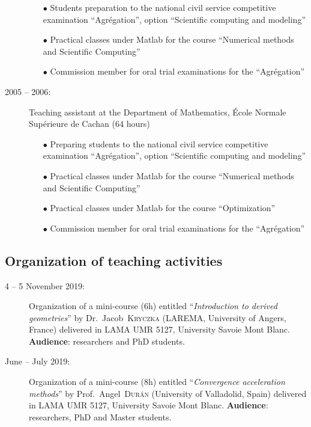 \begin{description}
        \begin{itemize}
            \item[$\bullet$] Students preparation to the national civil service competitive examination ``Agr\'egation'', option ``Scientific computing and modeling''
            \item[$\bullet$] Practical classes under Matlab for the course ``Numerical methods and Scientific Computing''
            \item[$\bullet$] Commission member for oral trial examinations for the ``Agr\'egation''
        \end{itemize}
        \item[2005 -- 2006:] Teaching assistant at the Department of Mathematics, \'Ecole Normale Sup\'erieure de Cachan (64 hours)
        \begin{itemize}
            \item[$\bullet$] Preparing students to the national civil service competitive examination ``Agr\'egation'', option ``Scientific computing and modeling''
            \item[$\bullet$] Practical classes under Matlab for the course ``Numerical methods and Scientific Computing''
            \item[$\bullet$] Practical classes under Matlab for the course ``Optimization''
            \item[$\bullet$] Commission member for oral trial examinations for the ``Agr\'egation''
        \end{itemize}
    \end{description}

    \separator
    \subsection{Organization of teaching activities}
    \begin{description}
        \item[4 -- 5 November 2019:] Organization of a mini-course (6h) entitled ``\textit{Introduction to derived geometries}'' by Dr.~Jacob~\textsc{Kryczka} (LAREMA, University of Angers, France) delivered in LAMA UMR 5127, University Savoie Mont Blanc. \textbf{Audience}: researchers and PhD students.
        \item[June -- July 2019:] Organization of a mini-course (8h) entitled ``\textit{Convergence acceleration methods}'' by Prof.~Angel~\textsc{Dur\'an} (University of Valladolid, Spain) delivered in LAMA UMR 5127, University Savoie Mont Blanc. \textbf{Audience}: researchers, PhD and Master students.
    \end{description}

